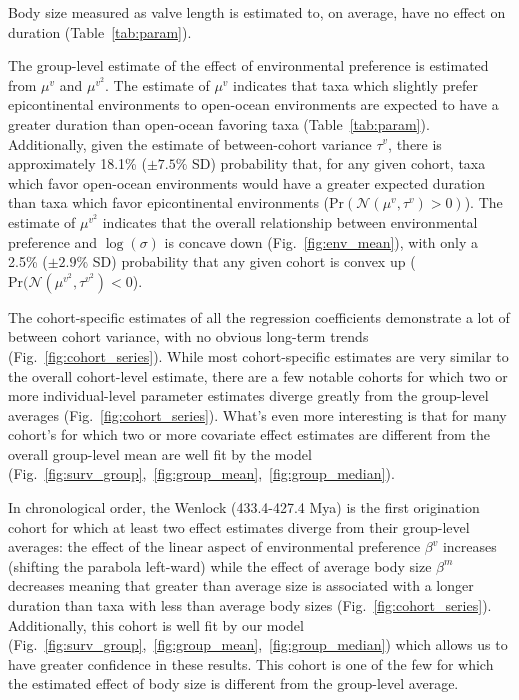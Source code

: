 \documentclass[11pt]{article}
\begin{document}
Body size measured as valve length is estimated to, on average, have no effect on duration (Table~\ref{tab:param}).

The group-level estimate of the effect of environmental preference is estimated from \(\mu^{v}\) and \(\mu^{v^{2}}\). The estimate of \(\mu^{v}\) indicates that taxa which slightly prefer epicontinental environments to open-ocean environments are expected to have a greater duration than open-ocean favoring taxa (Table~\ref{tab:param}). Additionally, given the estimate of between-cohort variance \(\tau^{v}\), there is approximately 18.1\% (\(\pm 7.5\%\) SD) probability that, for any given cohort, taxa which favor open-ocean environments would have a greater expected duration than taxa which favor epicontinental environments (\(\mathrm{Pr}(\mathcal{N}(\mu^{v}, \tau^{v}) > 0)\)). The estimate of \(\mu^{v^{2}}\) indicates that the overall relationship between environmental preference and \(\log(\sigma)\) is concave down (Fig.~\ref{fig:env_mean}), with only a 2.5\% (\(\pm 2.9\%\) SD) probability that any given cohort is convex up (\(\mathrm{Pr}(\mathcal{N}(\mu^{v^{2}}, \tau^{v^{2}}) < 0\)).

The cohort-specific estimates of all the regression coefficients demonstrate a lot of between cohort variance, with no obvious long-term trends (Fig.~\ref{fig:cohort_series}). While most cohort-specific estimates are very similar to the overall cohort-level estimate, there are a few notable cohorts for which two or more individual-level parameter estimates diverge greatly from the group-level averages (Fig.~\ref{fig:cohort_series}). What's even more interesting is that for many cohort's for which two or more covariate effect estimates are different from the overall group-level mean are well fit by the model (Fig.~\ref{fig:surv_group},~\ref{fig:group_mean},~\ref{fig:group_median}).


In chronological order, the Wenlock (433.4-427.4 Mya) is the first origination cohort for which at least two effect estimates diverge from their group-level averages: the effect of the linear aspect of environmental preference \(\beta^{v}\) increases (shifting the parabola left-ward) while the effect of average body size \(\beta^{m}\) decreases meaning that greater than average size is associated with a longer duration than taxa with less than average body sizes (Fig.~\ref{fig:cohort_series}). Additionally, this cohort is well fit by our model (Fig.~\ref{fig:surv_group},~\ref{fig:group_mean},~\ref{fig:group_median}) which allows us to have greater confidence in these results. This cohort is one of the few for which the estimated effect of body size is different from the group-level average.
\end{document}
